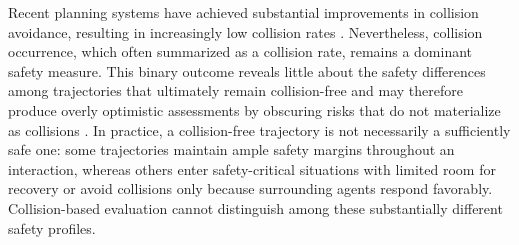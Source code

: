 \documentclass[letterpaper, 10 pt, conference]{ieeeconf}  %
\begin{document}

Recent planning systems have achieved substantial improvements in collision avoidance, resulting in increasingly low collision rates \cite{hamidaoui2025survey}. Nevertheless, collision occurrence, which often summarized as a collision rate, remains a dominant safety measure. This binary outcome reveals little about the safety differences among trajectories that ultimately remain collision-free \cite{weng2020mprism} and may therefore produce overly optimistic assessments by obscuring risks that do not materialize as collisions \cite{jiang2025interactive, cui2025unified}. In practice, a collision-free trajectory is not necessarily a sufficiently safe one: some trajectories maintain ample safety margins throughout an interaction, whereas others enter safety-critical situations with limited room for recovery or avoid collisions only because surrounding agents respond favorably. Collision-based evaluation cannot distinguish among these substantially different safety profiles.




\end{document}
